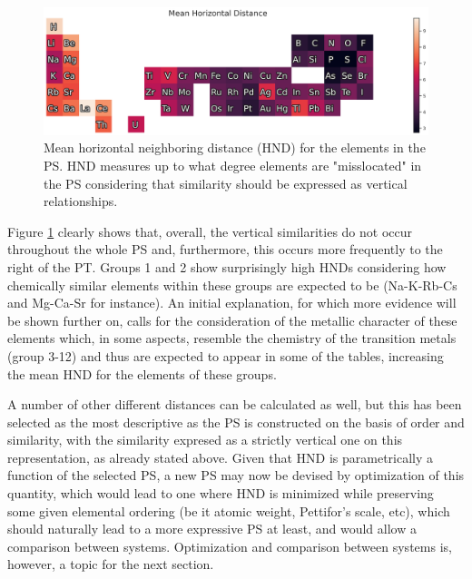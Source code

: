 \documentclass[]{article}
\begin{document}
\begin{figure}[h!]
  \centering
	\includegraphics[width=16.0cm]{meanHND.png}
	\caption{Mean horizontal neighboring distance (HND) for the elements in the PS. HND measures up to what degree elements are "misslocated" in the PS considering that similarity should be expressed as vertical relationships. }
	\label{fig:fig2}
\end{figure}

Figure \ref{fig:fig2} clearly shows that, overall, the vertical similarities do not occur throughout the whole PS and, furthermore, this occurs more frequently to the right of the PT. Groups 1 and 2 show surprisingly high HNDs considering how chemically similar elements within these groups are expected to be (Na-K-Rb-Cs and Mg-Ca-Sr for instance). An initial explanation, for which more evidence will be shown further on, calls for the consideration of the metallic character of these elements which, in some aspects, resemble the chemistry of the transition metals (group 3-12) and thus are expected to appear in some of the tables, increasing the mean HND for the elements of these groups.

A number of other different distances can be calculated as well, but this has been selected as the most descriptive as the PS is constructed on the basis of order and similarity, with the similarity expresed as a strictly vertical one on this representation, as already stated above. Given that HND is parametrically a function of the selected PS, a new PS may now be devised by optimization of this quantity, which would lead to one where HND is minimized while preserving some given elemental ordering (be it atomic weight, Pettifor's scale, etc), which should naturally lead to a more expressive PS at least, and would allow a comparison between systems. Optimization and comparison between systems is, however, a topic for the next section.
\end{document}
